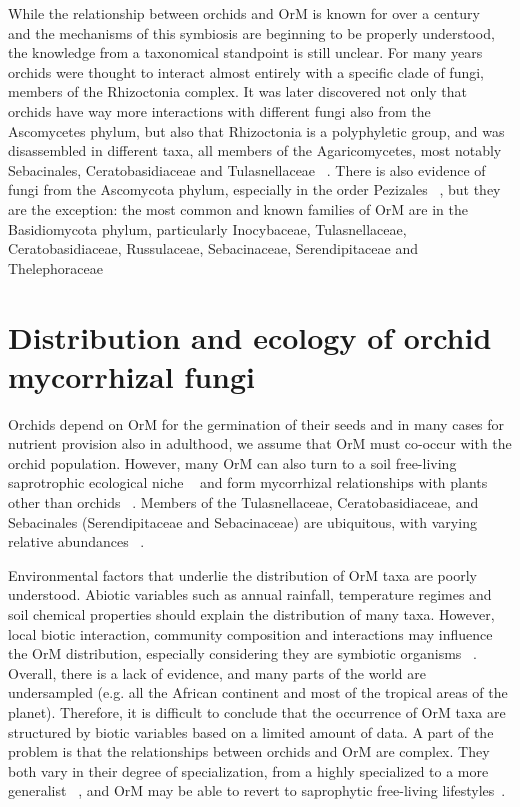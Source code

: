 While the relationship between orchids and OrM is known for over a century ~\citep{bernard1899, rayner1927, rasmussen2002, selosse2011} and the mechanisms of this symbiosis are beginning to be properly understood, the knowledge from a taxonomical standpoint is still unclear. For many years orchids were thought to interact almost entirely with a specific clade of fungi, members of the Rhizoctonia complex. It was later discovered not only that orchids have way more interactions with different fungi also from the Ascomycetes phylum, but also that Rhizoctonia is a polyphyletic group, and was disassembled in different taxa, all members of the Agaricomycetes, most notably Sebacinales, Ceratobasidiaceae and Tulasnellaceae ~\citep{dearnaley2012}.
There is also evidence of fungi from the Ascomycota phylum, especially in the order Pezizales ~\citep{selosse2004, ouanphanivanh2008, waterman2011}, but they are the exception: the most common and known families of OrM are in the Basidiomycota phylum, particularly Inocybaceae, Tulasnellaceae, Ceratobasidiaceae, Russulaceae, Sebacinaceae, Serendipitaceae and Thelephoraceae ~\citep{taylor2004, roy2009, duffy2019}

\section{Distribution and ecology of orchid mycorrhizal fungi}
\label{distributionandecologyoforchidmycorrhizalfungi}

Orchids depend on OrM for the germination of their seeds and in many cases for nutrient provision also in adulthood, we assume that OrM must co-occur with the orchid population. However, many OrM can also turn to a soil free-living saprotrophic ecological niche ~\citep{oberwinkler2017} and form mycorrhizal relationships with plants other than orchids ~\citep{selosse2014}. Members of the Tulasnellaceae, Ceratobasidiaceae, and Sebacinales (Serendipitaceae and Sebacinaceae) are ubiquitous, with varying relative abundances ~\citep{jacquemyn2017}.

Environmental factors that underlie the distribution of OrM taxa are poorly understood. Abiotic variables such as annual rainfall, temperature regimes and soil chemical properties should explain the distribution of many taxa. However, local biotic interaction, community composition and interactions may influence the OrM distribution, especially considering they are symbiotic organisms ~\citep{jacquemyn2017}. Overall, there is a lack of evidence, and many parts of the world are undersampled (e.g. all the African continent and most of the tropical areas of the planet). Therefore, it is difficult to conclude that the occurrence of OrM taxa are structured by biotic variables based on a limited amount of data. A part of the problem is that the relationships between orchids and OrM are complex. They both vary in their degree of specialization, from a highly specialized to a more generalist ~\citep{mccormick2004, girlanda2011, heijden2015}, and OrM may be able to revert to saprophytic free-living lifestyles~\citep{veldre2013}.

